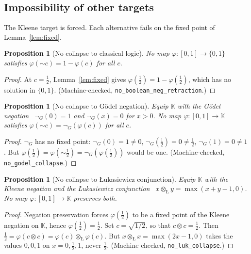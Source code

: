 \documentclass[11pt,a4paper]{article}
\newtheorem{proposition}[theorem]{Proposition}
\newcommand{\negc}{\mathord{\sim}}
\newcommand{\conjc}{\otimes}
\newcommand{\Kl}{\mathbb{K}}
\begin{document}
\subsection{Impossibility of other targets}

The Kleene target is forced.
Each alternative fails on the fixed point of Lemma~\ref{lem:fixed}.

\begin{proposition}[No collapse to classical logic]
\label{prop:no-classical}
No map $\varphi : [0,1] \to \{0,1\}$ satisfies
$\varphi(\negc c) = 1 - \varphi(c)$ for all $c$.
\end{proposition}

\begin{proof}
At $c = \tfrac{1}{2}$, Lemma~\ref{lem:fixed} gives
$\varphi(\tfrac{1}{2}) = 1 - \varphi(\tfrac{1}{2})$, which has no
solution in $\{0,1\}$.
(Machine-checked, \texttt{no\_boolean\_neg\_retraction}.)
\end{proof}

\begin{proposition}[No collapse to G\"odel negation]
\label{prop:no-godel}
Equip $\Kl$ with the G\"odel negation~\cite{godel1932}
$\neg_G(0) = 1$ and $\neg_G(x) = 0$ for $x > 0$.
No map $\varphi : [0,1] \to \Kl$ satisfies
$\varphi(\negc c) = \neg_G(\varphi(c))$ for all $c$.
\end{proposition}

\begin{proof}
$\neg_G$ has no fixed point: $\neg_G(0) = 1 \neq 0$,
$\neg_G(\tfrac{1}{2}) = 0 \neq \tfrac{1}{2}$,
$\neg_G(1) = 0 \neq 1$.
But $\varphi(\tfrac{1}{2}) = \varphi(\negc\tfrac{1}{2}) =
\neg_G(\varphi(\tfrac{1}{2}))$ would be one.
(Machine-checked, \texttt{no\_godel\_collapse}.)
\end{proof}

\begin{proposition}[No collapse to \L ukasiewicz conjunction]
\label{prop:no-luk}
Equip $\Kl$ with the Kleene negation and the \L ukasiewicz
conjunction~\cite{lukasiewicz1920}
$x \conjc_{\text{\L}} y = \max(x + y - 1, 0)$.
No map $\varphi : [0,1] \to \Kl$ preserves both.
\end{proposition}

\begin{proof}
Negation preservation forces $\varphi(\tfrac{1}{2})$ to be a fixed
point of the Kleene negation on $\Kl$, hence
$\varphi(\tfrac{1}{2}) = \tfrac{1}{2}$.
Set $c = \sqrt{1/2}$, so that $c \conjc c = \tfrac{1}{2}$.
Then
$\tfrac{1}{2} = \varphi(c \conjc c)
  = \varphi(c) \conjc_{\text{\L}} \varphi(c)$.
But $x \conjc_{\text{\L}} x = \max(2x - 1, 0)$ takes the values
$0, 0, 1$ on $x = 0, \tfrac{1}{2}, 1$, never $\tfrac{1}{2}$.
(Machine-checked, \texttt{no\_luk\_collapse}.)
\end{proof}
\end{document}
